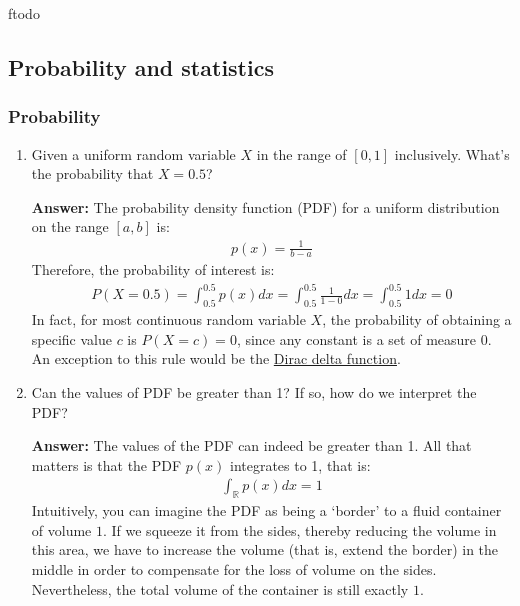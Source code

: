 ƒtodo\documentclass{article}
\newenvironment{QandA}{\begin{enumerate}[label=\arabic*.]}{\end{enumerate}}
\newenvironment{answer}{\par\normalfont \textbf{Answer:}}{}
\newcommand{\R}{\mathbb{R}}
\begin{document}
\subsection{Probability and statistics}
\subsubsection{Probability}

\begin{QandA}
    \item Given a uniform random variable $X$ in the range of $\left[ 0, 1 \right]$ inclusively. What's the probability that $X = 0.5$?
    \begin{answer}
        The probability density function (PDF) for a uniform distribution on the range $\left[a, b\right]$ is:
        \begin{align*}
            p(x) = \frac{1}{b-a}
        \end{align*}
        Therefore, the probability of interest is:
        \begin{align*}
            P(X=0.5) = \int_{0.5}^{0.5} p(x) dx = \int_{0.5}^{0.5} \frac{1}{1-0}dx = \int_{0.5}^{0.5} 1dx = 0
        \end{align*}
        In fact, for most continuous random variable $X$, the probability of obtaining a specific value $c$ is $P(X=c)=0$, since any constant is a set of measure $0$. An exception to this rule would be the \href{https://en.wikipedia.org/wiki/Dirac_delta_function}{Dirac delta function}.
    \end{answer}

    \item Can the values of PDF be greater than 1? If so, how do we interpret the PDF?
    \begin{answer}
        The values of the PDF can indeed be greater than 1. All that matters is that the PDF $p(x)$ integrates to 1, that is:
        \begin{align*}
            \int_{\R} p(x)dx = 1
        \end{align*}
        Intuitively, you can imagine the PDF as being a `border' to a fluid container of volume $1$. If we squeeze it from the sides, thereby reducing the volume in this area, we have to increase the volume (that is, extend the border) in the middle in order to compensate for the loss of volume on the sides. Nevertheless, the total volume of the container is still exactly $1$.
    \end{answer}
    

\end{QandA}
\end{document}
